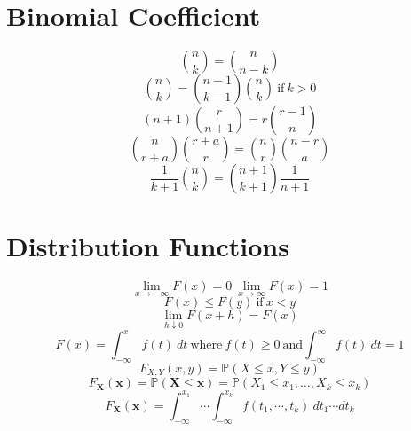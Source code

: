 \documentclass[twocolumn]{amsart}
\renewcommand{\P}{\mathbb{P}}
\begin{document}
\section*{Binomial Coefficient}
\begin{equation*}
  \binom{n}{k} = \binom{n}{n-k}
\end{equation*}
\begin{equation*}
  \binom{n}{k} = \binom{n-1}{k-1} \left( \frac{n}{k} \right)~\text{if}~k > 0
\end{equation*}
\begin{equation*}
  (n+1)\binom{r}{n+1} = r\binom{r-1}{n}
\end{equation*}
\begin{equation*}
  \binom{n}{r+a}\binom{r+a}{r} = \binom{n}{r}\binom{n-r}{a}
\end{equation*}
\begin{equation*}
  \frac{1}{k+1}\binom{n}{k} = \binom{n+1}{k+1}\frac{1}{n+1}
\end{equation*}

\section*{Distribution Functions}
\begin{equation*}
  \lim_{x\to-\infty}F(x)=0~\lim_{x\to\infty}F(x)=1
\end{equation*}
\begin{equation*}
  F(x) \leq F(y)~\text{if}~x<y
\end{equation*}
\begin{equation*}
  \lim_{h \downarrow 0}F(x+h)=F(x)
\end{equation*}
\begin{equation*}
  F(x)=\int_{-\infty}^{x}f(t)~dt~\text{where}~f(t)\geq
  0~\text{and}\int_{-\infty}^{\infty}f(t)~dt = 1
\end{equation*}
\begin{equation*}
  F_{X,Y}(x,y)=\P(X\leq x,Y\leq y)
\end{equation*}
\begin{equation*}
  F_{\boldsymbol{X}}(\boldsymbol{x})=\P(\boldsymbol{X}\leq\boldsymbol{x}) =
  \P(X_{1}\leq x_{1},\ldots,X_{k}\leq x_{k})
\end{equation*}
\begin{equation*}
  F_{\boldsymbol{X}}(\boldsymbol{x})=\int_{-\infty}^{x_{1}}\dotsi
  \int_{-\infty}^{x_{k}}f(t_{1},\cdots,t_{k})~dt_{1}\dotsm dt_{k}
\end{equation*}
\end{document}
